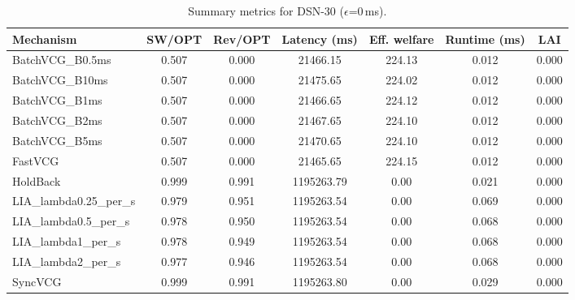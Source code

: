 \begin{table}[t]
\centering
\small
\setlength{\tabcolsep}{6pt}
\begin{tabular}{lcccccc}
\toprule
Mechanism & SW/OPT & Rev/OPT & Latency (ms) & Eff. welfare & Runtime (ms) & LAI \\
\midrule
BatchVCG_B0.5ms & 0.507 & 0.000 & 21466.15 & 224.13 & 0.012 & 0.000 \\
BatchVCG_B10ms & 0.507 & 0.000 & 21475.65 & 224.02 & 0.012 & 0.000 \\
BatchVCG_B1ms & 0.507 & 0.000 & 21466.65 & 224.12 & 0.012 & 0.000 \\
BatchVCG_B2ms & 0.507 & 0.000 & 21467.65 & 224.10 & 0.012 & 0.000 \\
BatchVCG_B5ms & 0.507 & 0.000 & 21470.65 & 224.10 & 0.012 & 0.000 \\
FastVCG & 0.507 & 0.000 & 21465.65 & 224.15 & 0.012 & 0.000 \\
HoldBack & 0.999 & 0.991 & 1195263.79 & 0.00 & 0.021 & 0.000 \\
LIA_lambda0.25_per_s & 0.979 & 0.951 & 1195263.54 & 0.00 & 0.069 & 0.000 \\
LIA_lambda0.5_per_s & 0.978 & 0.950 & 1195263.54 & 0.00 & 0.068 & 0.000 \\
LIA_lambda1_per_s & 0.978 & 0.949 & 1195263.54 & 0.00 & 0.068 & 0.000 \\
LIA_lambda2_per_s & 0.977 & 0.946 & 1195263.54 & 0.00 & 0.068 & 0.000 \\
SyncVCG & 0.999 & 0.991 & 1195263.80 & 0.00 & 0.029 & 0.000 \\
\bottomrule
\end{tabular}
\caption{Summary metrics for DSN-30 ($\epsilon$=0\,ms).}
\label{tab:dsn30_eps0p0}
\end{table}
